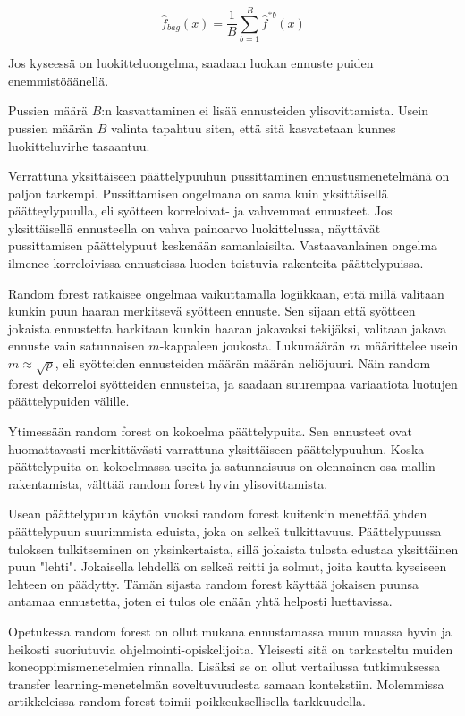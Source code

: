 \documentclass[finnish,twoside,openright]{HYgraduMLDS}
\begin{document}
\begin{equation}
    \hat{f}_{bag}(x) = \frac{1}{B} \sum^B_{b=1} \hat{f}^{*b}(x)
\end{equation}

Jos kyseessä on luokitteluongelma, saadaan luokan ennuste puiden enemmistöäänellä.\cite{james2013ISLR} 

Pussien määrä $B$:n kasvattaminen ei lisää ennusteiden ylisovittamista\cite{james2013ISLR}. Usein pussien määrän $B$ valinta tapahtuu siten, että sitä kasvatetaan kunnes luokitteluvirhe tasaantuu. 

Verrattuna yksittäiseen päättelypuuhun pussittaminen ennustusmenetelmänä on paljon tarkempi. Pussittamisen ongelmana on sama kuin yksittäisellä päätteylypuulla, eli syötteen korreloivat- ja vahvemmat ennusteet. Jos yksittäisellä ennusteella on vahva painoarvo luokittelussa, näyttävät pussittamisen päättelypuut keskenään samanlaisilta. Vastaavanlainen ongelma ilmenee korreloivissa ennusteissa luoden toistuvia rakenteita päättelypuissa.

Random forest ratkaisee ongelmaa vaikuttamalla logiikkaan, että millä valitaan kunkin puun haaran merkitsevä syötteen ennuste. Sen sijaan että syötteen jokaista ennustetta harkitaan kunkin haaran jakavaksi tekijäksi, valitaan jakava ennuste vain satunnaisen $m$-kappaleen joukosta. Lukumäärän $m$ määrittelee usein $m \approx \sqrt{p}$, eli syötteiden ennusteiden määrän määrän neliöjuuri. Näin random forest dekorreloi syötteiden ennusteita, ja saadaan suurempaa variaatiota luotujen päättelypuiden välille\cite{james2013ISLR}.

Ytimessään random forest on kokoelma päättelypuita. Sen ennusteet ovat huomattavasti merkittävästi varrattuna yksittäiseen päättelypuuhun\cite{james2013ISLR}. Koska päättelypuita on kokoelmassa useita ja satunnaisuus on olennainen osa mallin rakentamista, välttää random forest hyvin ylisovittamista\cite{james2013ISLR}. 

Usean päättelypuun käytön vuoksi random forest kuitenkin menettää yhden päättelypuun suurimmista eduista, joka on selkeä tulkittavuus\cite{james2013ISLR}. Päättelypuussa tuloksen tulkitseminen on yksinkertaista, sillä jokaista tulosta edustaa yksittäinen puun "lehti". Jokaisella lehdellä on selkeä reitti ja solmut, joita kautta kyseiseen lehteen on päädytty. Tämän sijasta random forest käyttää jokaisen puunsa antamaa ennustetta, joten ei tulos ole enään yhtä helposti luettavissa.

Opetukessa random forest on ollut mukana ennustamassa muun muassa hyvin ja heikosti suoriutuvia ohjelmointi-opiskelijoita. Yleisesti sitä on tarkasteltu muiden koneoppimismenetelmien rinnalla\cite{Ahadi:2015:EML:2787622.2787717}. Lisäksi se on ollut vertailussa tutkimuksessa transfer learning-menetelmän soveltuvuudesta samaan kontekstiin\cite{lagus2018transfer}. Molemmissa artikkeleissa random forest toimii poikkeuksellisella tarkkuudella.
\end{document}
